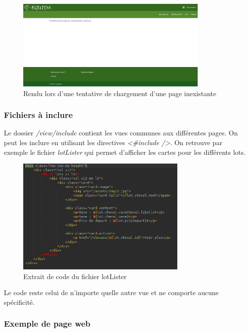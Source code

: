 				\begin{figure}[H]
					\centering\includegraphics[width=0.85\textwidth, keepaspectratio]{res/exempleErreur404.png}
					\caption{Rendu lors d'une tentative de chargement d'une page inexistante}
				\end{figure}

			\subsubsection{Fichiers à inclure}

				Le dossier \textit{/view/include} contient les vues communes aux différentes pages. On peut les inclure en utilisant les directives \textit{<\#include />}. On retrouve par exemple le fichier \textit{lotLister} qui permet d'afficher les cartes pour les différents lots.

				\begin{figure}[H]
					\centering\includegraphics[width=0.75\textwidth, keepaspectratio]{res/include-lotLister.png}
					\caption{Extrait de code du fichier lotLister}
				\end{figure}

				Le code reste celui de n'importe quelle autre vue et ne comporte aucune spécificité.

			\subsubsection{Exemple de page web}

